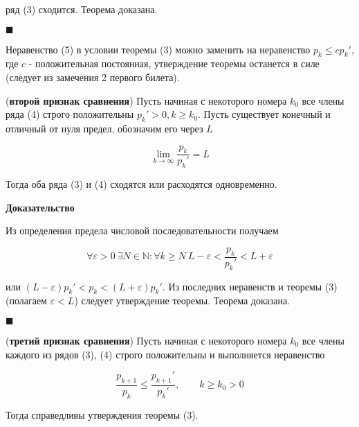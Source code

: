 ряд (3) сходится. Теорема доказана.

\begin{flushright}
	$\blacksquare$
\end{flushright}

\begin{note}
	Неравенство (5) в условии теоремы (3) можно заменить на неравенство $p_k \leqslant cp_k'$, где $c$ - положительная постоянная, утверждение теоремы останется в силе (следует из замечения 2 первого билета).
\end{note}

\begin{theorem}
	(\textbf{второй признак сравнения}) Пусть начиная с некоторого номера $k_0$ все члены ряда (4) строго положительны $p_k' > 0, k \geqslant k_0$. Пусть существует конечный и отличный от нуля предел, обозначим его через $L$
	
	\begin{equation}
		\displaystyle\lim_{k \rightarrow \infty} \frac{p_k}{p_k'} = L
	\end{equation}
	
	Тогда оба ряда (3) и (4) сходятся или расходятся одновременно.
\end{theorem}

\textbf{Доказательство}

Из определения предела числовой последовательности получаем

\begin{equation*}
	\forall\varepsilon > 0\ \exists N\in \mathbb{N}: \forall k \geqslant N\ L - \varepsilon < \frac{p_k}{p_k'} < L + \varepsilon
\end{equation*}

или $(L - \varepsilon)p_k' < p_k < (L + \varepsilon)p_k'$. Из последних неравенств и теоремы (3) (полагаем $\varepsilon < L$) следует утверждение теоремы. Теорема доказана.

\begin{flushright}
	$\blacksquare$
\end{flushright}

\begin{theorem}
	(\textbf{третий признак сравнения}) Пусть начиная с некоторого номера $k_0$ все члены каждого из рядов (3), (4) строго положительны и выполняется неравенство
	
	\begin{equation}
		\frac{p_{k + 1}}{p_k} \leqslant \frac{p_{k+1}'}{p_k'}, \qquad k \geqslant k_0 > 0
	\end{equation}
	
	Тогда справедливы утверждения теоремы (3).
\end{theorem}

